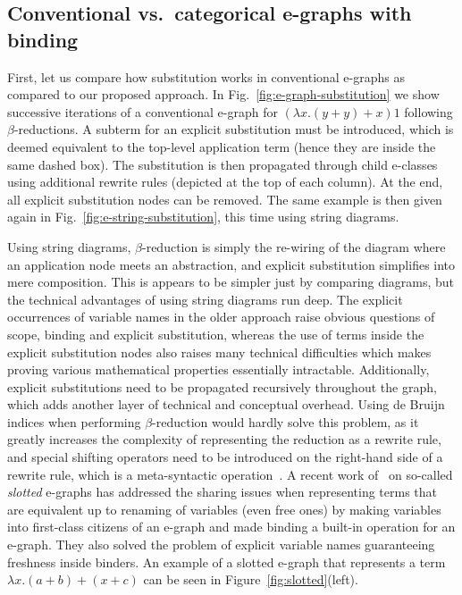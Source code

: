 \subsection{Conventional vs.\ categorical e-graphs with binding}%
\label{sec:vs-e-graphs-with-binding}

First, let us compare how substitution works in conventional e-graphs as compared to our proposed approach.
In Fig.~\ref{fig:e-graph-substitution} we show successive iterations of a conventional e-graph for $(\lambda x . (y + y) + x) 1$ following $\beta$-reductions.
A subterm for an explicit substitution must be introduced, which is deemed equivalent to the top-level application term (hence they are inside the same dashed box).
The substitution is then propagated through child e-classes using additional rewrite rules (depicted at the top of each column).
At the end, all explicit substitution nodes can be removed.
The same example is then given again in Fig.~\ref{fig:e-string-substitution}, this time using string diagrams.

Using string diagrams, $\beta$-reduction is simply the re-wiring of the diagram where an application node meets an abstraction, and explicit substitution simplifies into mere composition. 
This is appears to be simpler just by comparing diagrams, but the technical advantages of using string diagrams run deep.
The explicit occurrences of variable names in the older approach raise obvious questions of scope, binding and explicit substitution, whereas the use of terms inside the explicit substitution nodes also raises many technical difficulties which makes proving various mathematical properties essentially intractable.
Additionally, explicit substitutions need to be propagated recursively throughout the graph, which adds another layer of technical and conceptual overhead.
Using de Bruijn indices when performing $\beta$-reduction would hardly solve this problem, as it greatly increases the complexity of representing the reduction as a rewrite rule, and special shifting operators need to be introduced on the right-hand side of a rewrite rule, which is a meta-syntactic operation~\cite{koehler2022sketchguided}.
A recent work of~\cite{slotted-egraphs} on so-called \textit{slotted} e-graphs has addressed the sharing issues when representing terms that are equivalent up to renaming of variables (even free ones) by making variables into first-class citizens of an e-graph and made binding a built-in operation for an e-graph.
They also solved the problem of explicit variable names guaranteeing freshness inside binders.
An example of a slotted e-graph that represents a term $\lambda x . (a + b) + (x + c)$ can be seen in Figure~\ref{fig:slotted}(left).

